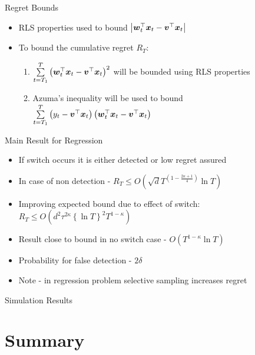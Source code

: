 \documentclass{beamer}
\begin{document}
\begin{frame}{Regret Bounds}
\begin{itemize}
\item RLS properties used to bound $\left\vert{{\boldsymbol{w}}}^{\top}_{t}{\boldsymbol{x}}_{t}-{{\boldsymbol{v}}}^{\top}{\boldsymbol{x}}_{t}\right\vert$\newline
\item To bound the cumulative regret $R_T$:\newline
\begin{enumerate}
\item $\sum\limits_{t=T_1}^{T}\left({{\boldsymbol{w}}}^{\top}_{t}{\boldsymbol{x}}_{t}-{{\boldsymbol{v}}}^{\top}{\boldsymbol{x}}_{t}\right)^2$ will be bounded using RLS properties\newline  
\item Azuma's inequality will be used to bound $\sum\limits_{t=T_1}^{T}\left(y_t-{{\boldsymbol{v}}}^{\top}{\boldsymbol{x}}_{t}\right)\left({{\boldsymbol{w}}}^{\top}_{t}{\boldsymbol{x}}_{t}-{{\boldsymbol{v}}}^{\top}{\boldsymbol{x}}_{t}\right)$
\end{enumerate}
\end{itemize}
\end{frame}

\begin{frame}{Main Result for Regression}
\begin{itemize}
\item If switch occurs it is either detected or low regret assured\newline
\item In case of non detection - $R_T\leq O\left(\sqrt{d}T^{\left(1-\frac{2\kappa+1}{4}\right)}\ln{T}\right)$\newline
\item Improving expected bound due to effect of switch: $R_T\leq O\left(d^2\tau^{2\kappa}\left\{\ln{T}\right\}^2T^{1-\kappa}\right)$\newline
\item Result close to bound in no switch case - $O\left(T^{1-\kappa}\ln{T}\right)$\newline
\item Probability for false detection - $2\delta$\newline
\item Note - in regression problem selective sampling increases regret
\end{itemize}
\end{frame}

\begin{frame}{Simulation Results}

\end{frame}

\section{Summary}
%
%
\end{document}
